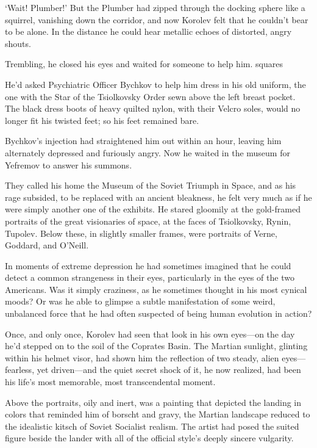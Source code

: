 ‘Wait! Plumber!’ But the Plumber had zipped through the docking sphere like a squirrel, vanishing down the corridor, and now Korolev felt that he couldn’t bear to be alone. In the distance he could hear metallic echoes of distorted, angry shouts.

Trembling, he closed his eyes and waited for someone to help him.
squares

He’d asked Psychiatric Officer Bychkov to help him dress in his old uniform, the one with the Star of the Tsiolkovsky Order sewn above the left breast pocket. The black dress boots of heavy quilted nylon, with their Velcro soles, would no longer fit his twisted feet; so his feet remained bare.

Bychkov’s injection had straightened him out within an hour, leaving him alternately depressed and furiously angry. Now he waited in the museum for Yefremov to answer his summons.

They called his home the Museum of the Soviet Triumph in Space, and as his rage subsided, to be replaced with an ancient bleakness, he felt very much as if he were simply another one of the exhibits. He stared gloomily at the gold-framed portraits of the great visionaries of space, at the faces of Tsiolkovsky, Rynin, Tupolev. Below these, in slightly smaller frames, were portraits of Verne, Goddard, and O’Neill.

In moments of extreme depression he had sometimes imagined that he could detect a common strangeness in their eyes, particularly in the eyes of the two Americans. Was it simply craziness, as he sometimes thought in his most cynical moods? Or was he able to glimpse a subtle manifestation of some weird, unbalanced force that he had often suspected of being human evolution in action?

Once, and only once, Korolev had seen that look in his own eyes—on the day he’d stepped on to the soil of the Coprates Basin. The Martian sunlight, glinting within his helmet visor, had shown him the reflection of two steady, alien eyes—fearless, yet driven—and the quiet secret shock of it, he now realized, had been his life’s most memorable, most transcendental moment.

Above the portraits, oily and inert, was a painting that depicted the landing in colors that reminded him of borscht and gravy, the Martian landscape reduced to the idealistic kitsch of Soviet Socialist realism. The artist had posed the suited figure beside the lander with all of the official style’s deeply sincere vulgarity.

